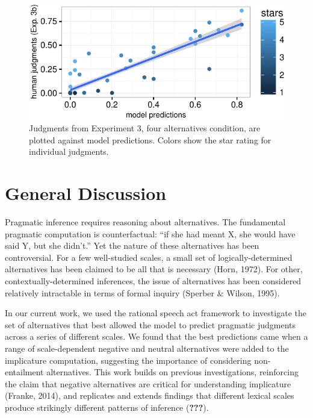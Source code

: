 \documentclass[10pt, letterpaper]{article}
\newenvironment{CodeChunk}{}{}
\begin{document}
\begin{CodeChunk}
\begin{figure}[t]

{\centering \includegraphics{figs/fiveAltsScatter-1} 

}

\caption[Judgments from Experiment 3, four alternatives condition, are plotted against model predictions]{Judgments from Experiment 3, four alternatives condition, are plotted against model predictions. Colors show the star rating for individual judgments.}\label{fig:fiveAltsScatter}
\end{figure}
\end{CodeChunk}

\section{General Discussion}\label{general-discussion}

Pragmatic inference requires reasoning about alternatives. The
fundamental pragmatic computation is counterfactual: ``if she had meant
X, she would have said Y, but she didn't.'' Yet the nature of these
alternatives has been controversial. For a few well-studied scales, a
small set of logically-determined alternatives has been claimed to be
all that is necessary (Horn, 1972). For other, contextually-determined
inferences, the issue of alternatives has been considered relatively
intractable in terms of formal inquiry (Sperber \& Wilson, 1995).

In our current work, we used the rational speech act framework to
investigate the set of alternatives that best allowed the model to
predict pragmatic judgments across a series of different scales. We
found that the best predictions came when a range of scale-dependent
negative and neutral alternatives were added to the implicature
computation, suggesting the importance of considering non-entailment
alternatives. This work builds on previous investigations, reinforcing
the claim that negative alternatives are critical for understanding
implicature (Franke, 2014), and replicates and extends findings that
different lexical scales produce strikingly different patterns of
inference ({\textbf{???}}).
\end{document}
